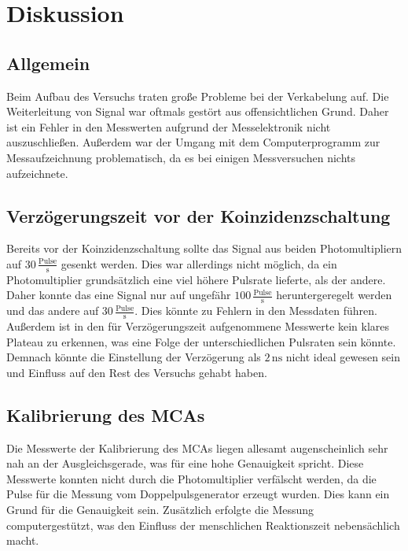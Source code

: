 \section{Diskussion}
\label{sec:Diskussion}
\subsection{Allgemein}
Beim Aufbau des Versuchs traten große Probleme bei der Verkabelung auf. Die Weiterleitung von Signal war oftmals gestört aus 
offensichtlichen Grund. Daher ist ein Fehler in den Messwerten aufgrund der Messelektronik nicht auszuschließen. Außerdem war 
der Umgang mit dem Computerprogramm zur Messaufzeichnung problematisch, da es bei einigen Messversuchen nichts aufzeichnete. 

\subsection{Verzögerungszeit vor der Koinzidenzschaltung}
Bereits vor der Koinzidenzschaltung sollte das Signal aus beiden Photomultipliern auf $30 \,\frac{\text{Pulse}}{\unit{\second}}$ gesenkt 
werden. Dies war allerdings nicht möglich, da ein Photomultiplier grundsätzlich eine viel höhere Pulsrate lieferte, als der andere. 
Daher konnte das eine Signal nur auf ungefähr $100 \,\frac{\text{Pulse}}{\unit{\second}}$ heruntergeregelt werden und das andere 
auf $30 \,\frac{\text{Pulse}}{\unit{\second}}$. Dies könnte zu Fehlern in den Messdaten führen. Außerdem ist in den für 
Verzögerungszeit aufgenommene Messwerte kein klares Plateau zu erkennen, was eine Folge der unterschiedlichen Pulsraten sein könnte. 
Demnach könnte die Einstellung der Verzögerung als $2 \, \unit{\nano\second}$ nicht ideal gewesen sein und Einfluss auf den Rest des 
Versuchs gehabt haben. 

\subsection{Kalibrierung des MCAs}
Die Messwerte der Kalibrierung des MCAs liegen allesamt augenscheinlich sehr nah an der Ausgleichsgerade, was für eine hohe 
Genauigkeit spricht. Diese Messwerte konnten nicht durch die Photomultiplier verfälscht werden, da die Pulse für die Messung 
vom Doppelpulsgenerator erzeugt wurden. Dies kann ein Grund für die Genauigkeit sein. Zusätzlich erfolgte die Messung computergestützt,
was den Einfluss der menschlichen Reaktionszeit nebensächlich macht. 

